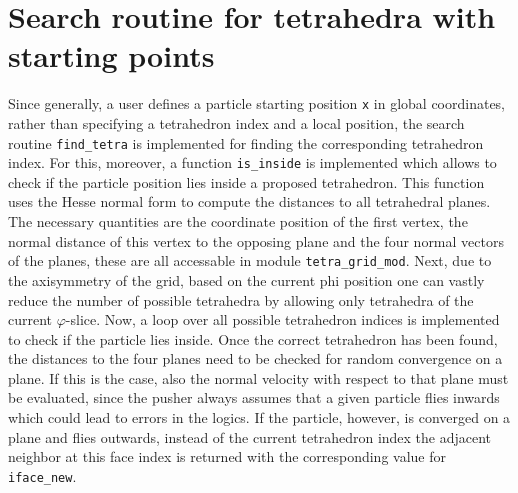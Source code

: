 \documentclass[./main.tex]{subfiles}
\begin{document}
\section{Search routine for tetrahedra with starting points}
Since generally, a user defines a particle starting position \texttt{x} in global coordinates, rather than specifying a tetrahedron index and a local position, the search routine \texttt{find\_tetra} is implemented for finding the corresponding tetrahedron index. For this, moreover, a function \texttt{is\_inside} is implemented which allows to check if the particle position lies inside a proposed tetrahedron. This function uses the Hesse normal form to compute the distances to all tetrahedral planes. The necessary quantities are the coordinate position of the first vertex, the normal distance of this vertex to the opposing plane and the four normal vectors of the planes, these are all accessable in module \texttt{tetra\_grid\_mod}. Next, due to the axisymmetry of the grid, based on the current phi position one can vastly reduce the number of possible tetrahedra by allowing only tetrahedra of the current $\varphi$-slice. Now, a loop over all possible tetrahedron indices is implemented to check if the particle lies inside. Once the correct tetrahedron has been found, the distances to the four planes need to be checked for random convergence on a plane. If this is the case, also the normal velocity with respect to that plane must be evaluated, since the pusher always assumes that a given particle flies inwards which could lead to errors in the logics. If the particle, however, is converged on a plane and flies outwards, instead of the current tetrahedron index the adjacent neighbor at this face index is returned with the corresponding value for \texttt{iface\_new}. 
\end{document}
